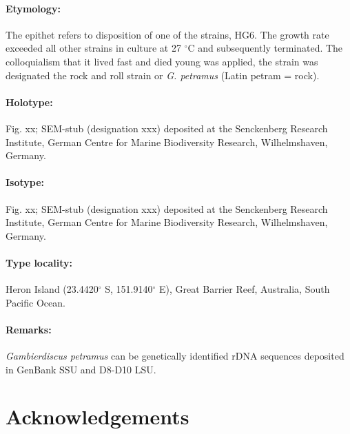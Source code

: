 \documentclass[12pt]{article}
\begin{document}
 \paragraph{Etymology:} The epithet refers to disposition of one of the strains, HG6. The growth rate exceeded all other strains in culture at 27 $^{\circ}$C and subsequently terminated. The colloquialism that it lived fast and died young was applied, the strain was designated the rock and roll strain or \emph{G. petramus} (Latin petram = rock).
\paragraph{Holotype:} Fig. xx; SEM-stub (designation xxx) deposited at the Senckenberg Research Institute, German Centre for Marine Biodiversity Research, Wilhelmshaven, Germany.
\paragraph{Isotype:} Fig. xx; SEM-stub (designation xxx) deposited at the Senckenberg Research Institute, German Centre for Marine Biodiversity Research, Wilhelmshaven, Germany.
\paragraph{Type locality:} Heron Island (23.4420$^{\circ}$ S, 151.9140$^{\circ}$ E), Great Barrier Reef, Australia, South Pacific Ocean.
\paragraph{Remarks:} \emph{Gambierdiscus petramus} can be genetically identified rDNA sequences deposited in GenBank SSU and D8-D10 LSU.

\newpage
\section{Acknowledgements}
\end{document}
